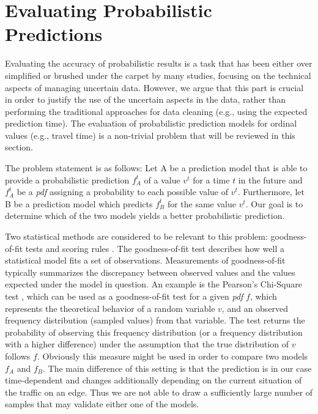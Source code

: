 \section{Evaluating Probabilistic Predictions}
\vspace{0.2cm}
\label{sec:evaluate}
Evaluating the accuracy of probabilistic results is a task that has been either over simplified or brushed under the carpet by many studies, focusing on the technical aspects of managing uncertain data. However, we argue that this part is crucial in order to justify the use of the uncertain aspects in the data, rather than performing the traditional approaches for data cleaning (e.g., using the expected prediction time). The evaluation of probabilistic prediction models for ordinal values (e.g., travel time) is a non-trivial problem that will be reviewed in this section.

The problem statement is as follows: Let A be a prediction model that is able to provide a probabilistic prediction $f_A^t$ of a value $v^t$ for a time $t$ in the future and $f_A^t$ be a \textit{pdf} assigning a probability to each possible value of $v^t$. Furthermore, let B be a prediction model which predicts $f_B^t$ for the same value $v^t$. Our goal is to determine which of the two models yields a better probabilistic prediction.

Two statistical methods are considered to be relevant to this problem: goodness-of-fit tests \cite{Taylor97} and scoring rules \cite{Bickel07}. The goodness-of-fit test describes how well a statistical model fits a set of observations. Measurements of goodness-of-fit typically summarizes the discrepancy between observed values and the values expected under the model in question. An example is the Pearson's Chi-Square test \cite{Pearson00}, which can be used as a goodness-of-fit test for a given \textit{pdf} $f$, which represents the theoretical behavior of a random variable $v$, and an observed frequency distribution (sampled values) from that variable. The test returns the probability of observing this frequency distribution (or a frequency distribution with a higher difference) under the assumption that the true distribution of $v$ follows $f$. Obviously this measure might be used in order to compare two models $f_A$ and $f_B$. The main difference of this setting is that the prediction is in our case time-dependent and changes additionally depending on the current situation of the traffic on an edge. Thus we are not able to draw a sufficiently large number of samples that may validate either one of the models.

